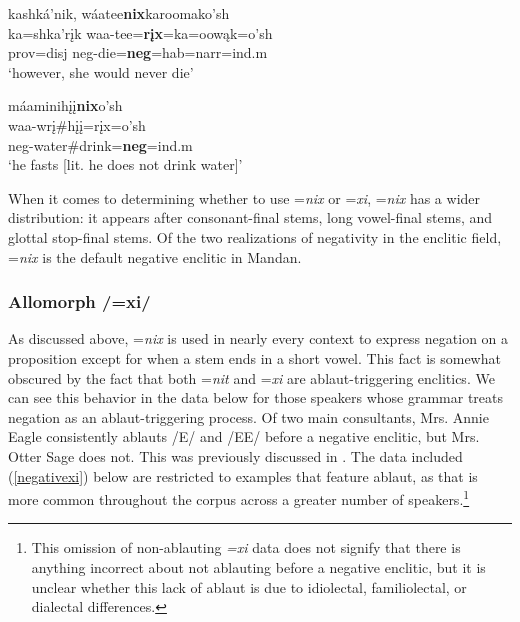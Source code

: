 \begin{exe}
\begin{xlist}
	\item\label{negativenix5}
	\glll kashká'nik, wáatee\textbf{nix}karoomako'sh\\
	ka=shka'rįk waa-tee=\textbf{rįx}=ka=oowąk=o'sh\\
	prov=disj neg-\textnormal{die}=\textbf{neg}=hab=narr=ind.m\\
	\glt `however, she would never die' \citep[287]{hollow1973b}

	\item\label{negativenix6}
	\glll máaminihįį\textbf{nix}o'sh\\
	waa-wrį\#hįį=rįx=o'sh\\
	neg-\textnormal{water}\#\textnormal{drink}=\textbf{neg}=ind.m\\
	\glt `he fasts [lit. he does not drink water]' \citep[303]{hollow1970}
	
	\end{xlist}

\end{exe}

When it comes to determining whether to use =\textit{nix} or =\textit{xi}, =\textit{nix} has a wider distribution: it appears after consonant-final stems, long vowel-final stems, and glottal stop-final stems. Of the two realizations of negativity in the enclitic field, =\textit{nix} is the default negative enclitic in Mandan.

\subsubsection{Allomorph /=xi/}\label{SubSubXI}

As discussed above, =\textit{nix} is used in nearly every context to express negation on a proposition except for when a stem ends in a short vowel. This fact is somewhat obscured by the fact that both =\textit{nit} and =\textit{xi} are ablaut-triggering enclitics. We can see this behavior in the data below for those speakers whose grammar treats negation as an ablaut-triggering process. Of  two main consultants, Mrs. Annie Eagle consistently ablauts /E/ and /EE/ before a negative enclitic, but Mrs. Otter Sage does not. This was previously discussed in . The data included (\ref{negativexi}) below are restricted to examples that feature ablaut, as that is more common throughout the corpus across a greater number of speakers.\footnote{This omission of non-ablauting \textit{=xi} data does not signify that there is anything incorrect about not ablauting before a negative enclitic, but it is unclear whether this lack of ablaut is due to idiolectal, familiolectal, or dialectal differences.}

